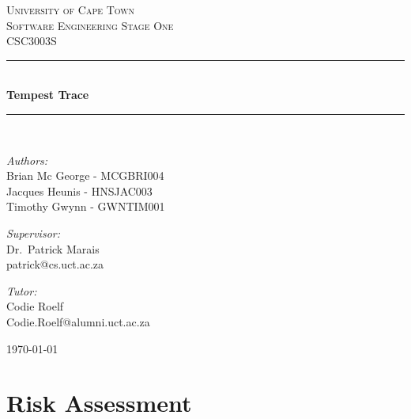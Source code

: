 \documentclass[a4paper,10pt]{article}
\begin{document}
\begin{titlepage} \begin{center} 
		\textsc{\LARGE University of Cape Town}
		\\[1.5cm] \textsc{\Large Software Engineering Stage One\\CSC3003S}
		\\[0.5cm]
		\noindent\rule[0.4mm]{\textwidth}{0.4mm}
		\\[0.4cm] { \huge \bfseries Tempest Trace \\[0.4cm] }
		\noindent\rule[0.4mm]{\textwidth}{0.4mm}
		\noindent
		\\[1cm]
		\begin{minipage}[t]{0.4\textwidth}
		\begin{flushleft}\large \emph{Authors:}\\ Brian Mc George - MCGBRI004 \\ Jacques Heunis - HNSJAC003 \\ Timothy Gwynn - GWNTIM001\end{flushleft}
		 \end{minipage} \begin{minipage}[t]{0.4\textwidth} 
		\begin{flushright} \large \emph{Supervisor:} \\ Dr.~Patrick Marais\\patrick@cs.uct.ac.za\end{flushright}
		\begin{flushright} \large \emph{Tutor:} \\ Codie Roelf\\Codie.Roelf@alumni.uct.ac.za\end{flushright}
		 \end{minipage} \vfill {\large \today}
		\end{center}
		\end{titlepage}
\newpage
\tableofcontents
\newpage

\section{Risk Assessment}
\end{document}
